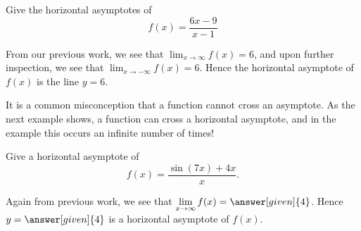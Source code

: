 \documentclass{ximera}
\begin{document}
\begin{example} 
Give the horizontal asymptotes of
\[
f(x) = \frac{6x-9}{x-1}
\]
\begin{explanation}
From our previous work, we see that $\displaystyle\lim_{x\to \infty} f(x) = 6$, and
upon further inspection, we see that $\displaystyle\lim_{x\to -\infty} f(x) =
6$. Hence the horizontal asymptote of $f(x)$ is the line $y=6$.
\end{explanation}
\end{example}


It is a common misconception that a function cannot cross an
asymptote. As the next example shows, a function can cross a horizontal
asymptote, and in the example this occurs an infinite number of times!

\begin{example}
Give a horizontal asymptote of
\[
f(x) = \frac{\sin(7x)+4x}{x}.
\]
\begin{explanation}
Again from previous work, we see that $\displaystyle\lim_{x\to \infty} f(x) =
\answer[given]{4}$. Hence $y=\answer[given]{4}$ is a horizontal asymptote of $f(x)$.
\end{explanation}
\end{example}
\end{document}
